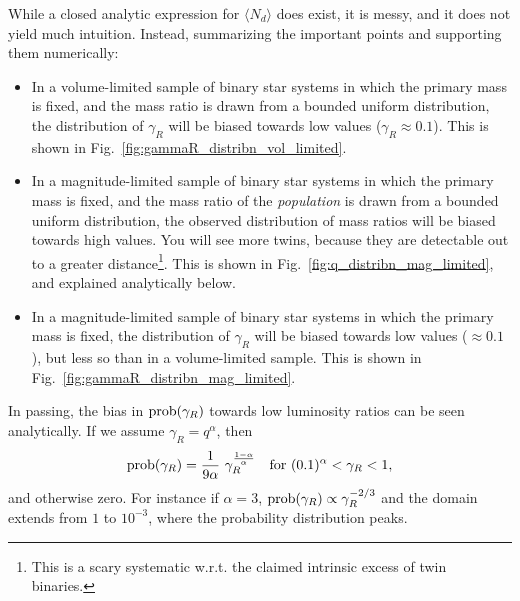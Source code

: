 \documentclass{emulateapj}
\begin{document}
While a closed analytic expression for $\langle N_d \rangle$ does exist, it is 
messy, and it does not yield much intuition. Instead, summarizing the important 
points and supporting them numerically:
\begin{itemize}
	\item In a volume-limited sample of binary star systems in which the 
	primary mass is fixed, and the mass ratio is drawn from a bounded uniform 
	distribution, the distribution of $\gamma_R$ will be biased towards low 
	values ($\gamma_R \approx 0.1$). This is shown in 
	Fig.~\ref{fig:gammaR_distribn_vol_limited}.
	\item In a magnitude-limited sample of binary star systems in which the 
	primary mass is fixed, and the mass ratio of the \textit{population} is 
	drawn from a bounded uniform distribution, the observed distribution of 
	mass ratios will be biased towards high values. You will see more twins,
	because they are detectable out to a greater distance\footnote{This is a 
	scary systematic w.r.t. the claimed intrinsic excess of twin binaries.}. 
	This is shown in Fig.~\ref{fig:q_distribn_mag_limited}, and explained 
	analytically below.
	\item In a magnitude-limited sample of binary star systems in which the 
	primary mass is fixed, the distribution of $\gamma_R$ will be biased 
	towards low values ($\approx 0.1$), but less so than in a 
	volume-limited sample. This is shown in 
	Fig.~\ref{fig:gammaR_distribn_mag_limited}.
\end{itemize}

In passing, the bias in ${\rm prob}(\gamma_R)$ towards low luminosity ratios 
can be seen analytically. If we assume $\gamma_R = q^\alpha$, then
\begin{equation}
{\rm prob}(\gamma_R) = \frac{1}{9 \alpha} \ \gamma_R^{\frac{1-\alpha}{\alpha}}
\quad {\rm for\ } (0.1)^\alpha < \gamma_R < 1,
\end{equation}
and otherwise zero. For instance if $\alpha = 3$, ${\rm prob}(\gamma_R) 
\propto \gamma_R^{-2/3}$ and the domain extends from $1$ to 
$10^{-3}$, where the probability distribution peaks.
\end{document}
